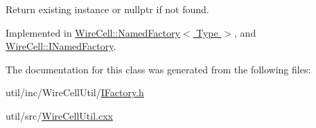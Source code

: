 Return existing instance or nullptr if not found. 



Implemented in \hyperlink{class_wire_cell_1_1_named_factory_a1c0faed7ba682bd801069997d60ea81b}{Wire\+Cell\+::\+Named\+Factory$<$ Type $>$}, and \hyperlink{class_wire_cell_1_1_i_named_factory_a4e87a7c8957a57aa6d23fef2f9e1dbd3}{Wire\+Cell\+::\+I\+Named\+Factory}.



The documentation for this class was generated from the following files\+:\begin{DoxyCompactItemize}
\item 
util/inc/\+Wire\+Cell\+Util/\hyperlink{_i_factory_8h}{I\+Factory.\+h}\item 
util/src/\hyperlink{_wire_cell_util_8cxx}{Wire\+Cell\+Util.\+cxx}\end{DoxyCompactItemize}
